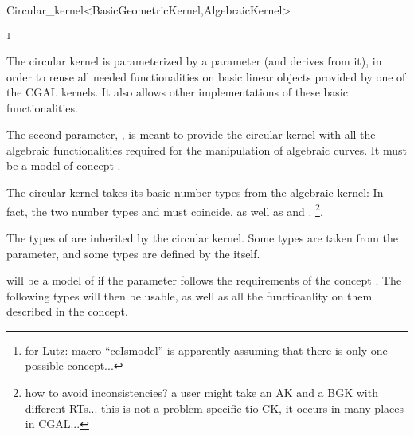 \begin{ccRefClass}{Circular_kernel<BasicGeometricKernel,AlgebraicKernel>}

\ccDefinition


\ccIsModel

\footnote{for Lutz: macro ``ccIsmodel'' is
apparently assuming that there is only one possible concept...}

\ccParameters

The circular kernel is parameterized by a  parameter
(and derives from it), in order to reuse all needed functionalities on
basic linear objects provided by one of the CGAL kernels. It also
allows other implementations of these basic functionalities.

The second parameter, , is meant to provide the
circular kernel with all the algebraic functionalities required for the
manipulation of algebraic curves. 
It must be a model of concept . 

\ccInheritsFrom


\ccTypes

\ccThreeToTwo

The circular kernel takes its basic number types from the algebraic kernel:
In fact, the two number types  and
 must coincide, as well as
 and .
\footnote{how to avoid inconsistencies? a user might take an AK and a
BGK with different RTs... this is not a problem specific tio CK, it occurs 
in many places in CGAL...}. 

The types of  are inherited by the circular kernel.
Some types are taken from the  parameter, and
some types are defined by the  itself.

 will be a model of  if the 
 parameter follows the requirements of the 
concept . The following types will then be
usable, as well as all the functioanlity on them described in the
 concept. 


\end{ccRefClass}
